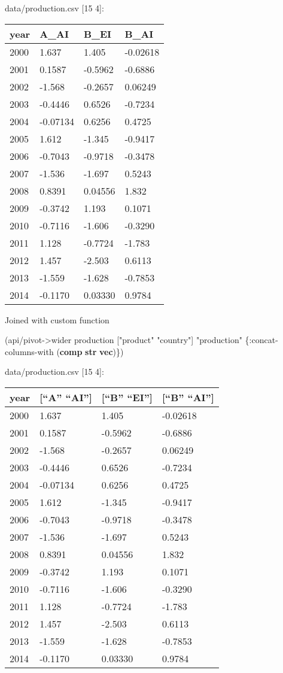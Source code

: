 \documentclass[]{article}
\newenvironment{Shaded}{\begin{snugshade}}{\end{snugshade}}
\newcommand{\KeywordTok}[1]{\textcolor[rgb]{0.13,0.29,0.53}{\textbf{#1}}}
\newcommand{\StringTok}[1]{\textcolor[rgb]{0.31,0.60,0.02}{#1}}
\newcommand{\AttributeTok}[1]{\textcolor[rgb]{0.77,0.63,0.00}{#1}}
\newcommand{\NormalTok}[1]{#1}
\begin{document}
data/production.csv {[}15 4{]}:

\begin{longtable}[]{@{}llll@{}}
\toprule
year & A\_AI & B\_EI & B\_AI\tabularnewline
\midrule
\endhead
2000 & 1.637 & 1.405 & -0.02618\tabularnewline
2001 & 0.1587 & -0.5962 & -0.6886\tabularnewline
2002 & -1.568 & -0.2657 & 0.06249\tabularnewline
2003 & -0.4446 & 0.6526 & -0.7234\tabularnewline
2004 & -0.07134 & 0.6256 & 0.4725\tabularnewline
2005 & 1.612 & -1.345 & -0.9417\tabularnewline
2006 & -0.7043 & -0.9718 & -0.3478\tabularnewline
2007 & -1.536 & -1.697 & 0.5243\tabularnewline
2008 & 0.8391 & 0.04556 & 1.832\tabularnewline
2009 & -0.3742 & 1.193 & 0.1071\tabularnewline
2010 & -0.7116 & -1.606 & -0.3290\tabularnewline
2011 & 1.128 & -0.7724 & -1.783\tabularnewline
2012 & 1.457 & -2.503 & 0.6113\tabularnewline
2013 & -1.559 & -1.628 & -0.7853\tabularnewline
2014 & -0.1170 & 0.03330 & 0.9784\tabularnewline
\bottomrule
\end{longtable}

Joined with custom function

\begin{Shaded}
\begin{Highlighting}[]
\NormalTok{(api/pivot->wider production [}\StringTok{"product"} \StringTok{"country"}\NormalTok{] }\StringTok{"production"}\NormalTok{ \{}\AttributeTok{:concat-columns-with}\NormalTok{ (}\KeywordTok{comp} \KeywordTok{str} \KeywordTok{vec}\NormalTok{)\})}
\end{Highlighting}
\end{Shaded}

data/production.csv {[}15 4{]}:

\begin{longtable}[]{@{}llll@{}}
\toprule
year & {[}``A'' ``AI''{]} & {[}``B'' ``EI''{]} & {[}``B''
``AI''{]}\tabularnewline
\midrule
\endhead
2000 & 1.637 & 1.405 & -0.02618\tabularnewline
2001 & 0.1587 & -0.5962 & -0.6886\tabularnewline
2002 & -1.568 & -0.2657 & 0.06249\tabularnewline
2003 & -0.4446 & 0.6526 & -0.7234\tabularnewline
2004 & -0.07134 & 0.6256 & 0.4725\tabularnewline
2005 & 1.612 & -1.345 & -0.9417\tabularnewline
2006 & -0.7043 & -0.9718 & -0.3478\tabularnewline
2007 & -1.536 & -1.697 & 0.5243\tabularnewline
2008 & 0.8391 & 0.04556 & 1.832\tabularnewline
2009 & -0.3742 & 1.193 & 0.1071\tabularnewline
2010 & -0.7116 & -1.606 & -0.3290\tabularnewline
2011 & 1.128 & -0.7724 & -1.783\tabularnewline
2012 & 1.457 & -2.503 & 0.6113\tabularnewline
2013 & -1.559 & -1.628 & -0.7853\tabularnewline
2014 & -0.1170 & 0.03330 & 0.9784\tabularnewline
\bottomrule
\end{longtable}
\end{document}
